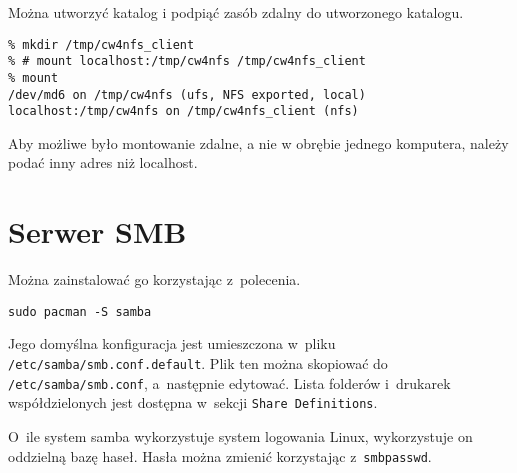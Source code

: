 \documentclass[a4paper,11pt]{article}
\begin{document}
Można utworzyć katalog i podpiąć zasób zdalny do utworzonego katalogu.

\footnotesize\begin{verbatim}
% mkdir /tmp/cw4nfs_client
% # mount localhost:/tmp/cw4nfs /tmp/cw4nfs_client
% mount
/dev/md6 on /tmp/cw4nfs (ufs, NFS exported, local)
localhost:/tmp/cw4nfs on /tmp/cw4nfs_client (nfs)
\end{verbatim}\normalsize

Aby możliwe było montowanie zdalne, a nie w obrębie jednego komputera, należy podać inny adres niż localhost.




\section{Serwer SMB}

Można zainstalować go korzystając z~polecenia.

\begin{verbatim}
sudo pacman -S samba
\end{verbatim}

Jego domyślna konfiguracja jest umieszczona w~pliku \verb|/etc/samba/smb.conf.default|. Plik
ten można skopiować do \verb|/etc/samba/smb.conf|, a~następnie edytować. Lista folderów
i~drukarek współdzielonych jest dostępna w~sekcji \verb|Share Definitions|.

O~ile system samba wykorzystuje system logowania Linux, wykorzystuje on oddzielną bazę haseł.
Hasła można zmienić korzystając z~\verb|smbpasswd|.
\end{document}
